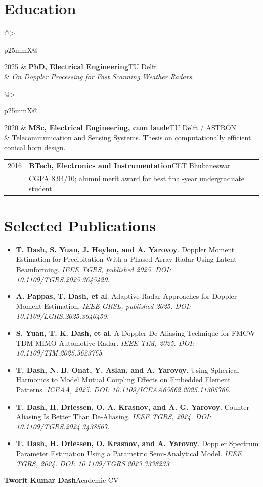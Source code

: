 \documentclass[10pt,a4paper]{article}
\makeatletter
\newcommand{\entry}[4]{\begin{tabularx}{\linewidth}{@{}>{\raggedright\arraybackslash}p{25mm}X@{}}\color{muted}\small #1 & \textbf{#2}\hfill{\small\color{muted}#3}\\ & #4\end{tabularx}\vspace{1.5pt}}
\newcommand{\pub}[3]{\item \textbf{#1}. #2. \textit{#3}.}
\makeatother
\begin{document}
\section{Education}
\entry{2025}{PhD, Electrical Engineering}{TU Delft}{\textit{On Doppler Processing for Fast Scanning Weather Radars}.}
\entry{2020}{MSc, Electrical Engineering, cum laude}{TU Delft / ASTRON}{Telecommunication and Sensing Systems. Thesis on computationally efficient conical horn design.}
\entry{2016}{BTech, Electronics and Instrumentation}{CET Bhubaneswar}{CGPA 8.94/10; alumni merit award for best final-year undergraduate student.}

\section{Selected Publications}
\begin{itemize}
\pub{T. Dash, S. Yuan, J. Heylen, and A. Yarovoy}{Doppler Moment Estimation for Precipitation With a Phased Array Radar Using Latent Beamforming}{IEEE TGRS, published 2025. DOI: 10.1109/TGRS.2025.3645429}
\pub{A. Pappas, T. Dash, et al}{Adaptive Radar Approaches for Doppler Moment Estimation}{IEEE GRSL, published 2025. DOI: 10.1109/LGRS.2025.3646459}
\pub{S. Yuan, T. K. Dash, et al}{A Doppler De-Aliasing Technique for FMCW-TDM MIMO Automotive Radar}{IEEE TIM, 2025. DOI: 10.1109/TIM.2025.3623765}
\pub{T. Dash, N. B. Onat, Y. Aslan, and A. Yarovoy}{Using Spherical Harmonics to Model Mutual Coupling Effects on Embedded Element Patterns}{ICEAA, 2025. DOI: 10.1109/ICEAA65662.2025.11305766}
\pub{T. Dash, H. Driessen, O. A. Krasnov, and A. G. Yarovoy}{Counter-Aliasing Is Better Than De-Aliasing}{IEEE TGRS, 2024. DOI: 10.1109/TGRS.2024.3438567}
\pub{T. Dash, H. Driessen, O. Krasnov, and A. Yarovoy}{Doppler Spectrum Parameter Estimation Using a Parametric Semi-Analytical Model}{IEEE TGRS, 2024. DOI: 10.1109/TGRS.2023.3338233}
\end{itemize}

\newpage
{\Large\bfseries Tworit Kumar Dash}\hfill{\small\color{muted}Academic CV}
\end{document}
